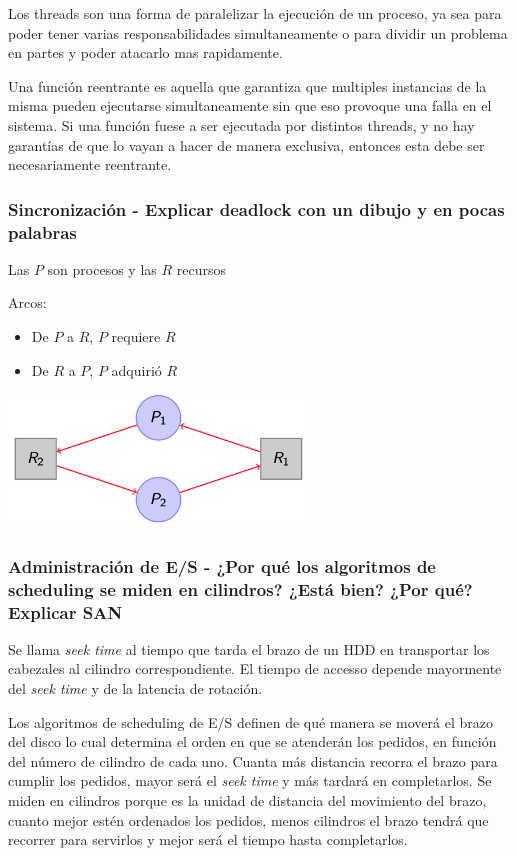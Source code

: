 Los threads son una forma de paralelizar la ejecución de un proceso, ya sea para poder tener varias responsabilidades simultaneamente o para dividir un problema en partes y poder atacarlo mas rapidamente.

Una función reentrante es aquella que garantiza que multiples instancias de la misma pueden ejecutarse simultaneamente sin que eso provoque una falla en el sistema. Si una función fuese a ser ejecutada por distintos threads, y no hay garantías de que lo vayan a hacer de manera exclusiva, entonces esta debe ser necesariamente reentrante.

\subsubsection{Sincronización - Explicar deadlock con un dibujo y en pocas palabras}

Las $P$ son procesos y las $R$ recursos

Arcos:
\begin{itemize}
\item De $P$ a $R$, $P$ requiere $R$
\item De $R$ a $P$, $P$ adquirió $R$
\end{itemize}

\includegraphics[width=0.6\textwidth]{imagenes/deadlock}

\subsubsection{Administración de E/S - ¿Por qué los algoritmos de scheduling se miden en cilindros? ¿Está bien? ¿Por qué? Explicar SAN}
Se llama \textit{seek time} al tiempo que tarda el brazo de un HDD en transportar los cabezales al cilindro correspondiente. El tiempo de accesso depende mayormente del \textit{seek time} y de la latencia de rotación.

Los algoritmos de scheduling de E/S definen de qué manera se moverá el brazo del disco lo cual determina el orden en que se atenderán los pedidos, en función del número de cilindro de cada uno. Cuanta más distancia recorra el brazo para cumplir los pedidos, mayor será el \textit{seek time} y más tardará en completarlos. Se miden en cilindros porque es la unidad de distancia del movimiento del brazo, cuanto mejor estén ordenados los pedidos, menos cilindros el brazo tendrá que recorrer para servirlos y mejor será el tiempo hasta completarlos.

